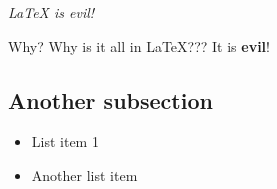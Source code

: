 \textit{LaTeX is evil!} 

Why? Why is it all in LaTeX??? It is \textbf{evil}!


\subsection{Another subsection}
\begin{itemize}
\item List item 1
\item Another list item
\end{itemize}